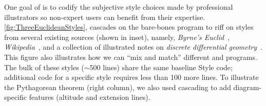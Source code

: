 One goal of \Penrose{} is to codify the subjective style choices made by professional illustrators so non-expert users can benefit from their expertise.  \cref{fig:ThreeEuclideanStyles},  cascades on the bare-bones \Style{} program to riff on styles from several existing sources (shown in inset), namely, \emph{Byrne's Euclid}~\cite{Byrne:1847:FSB}, \emph{Wikipedia}~\cite{Wikimedia:2006:IEP}, and a collection of illustrated notes on \emph{discrete differential geometry}~\cite{Crane:2013:DGP}. This figure also illustrates how we can ``mix and match'' different \Style{} and \Substance{} programs. The bulk of these styles (\(\sim\)500 lines) share the same baseline Style code; additional code for a specific style requires less than 100 more lines. To illustrate the Pythagorean theorem (right column), we also used cascading to add diagram-specific features (\eg altitude and extension lines).

